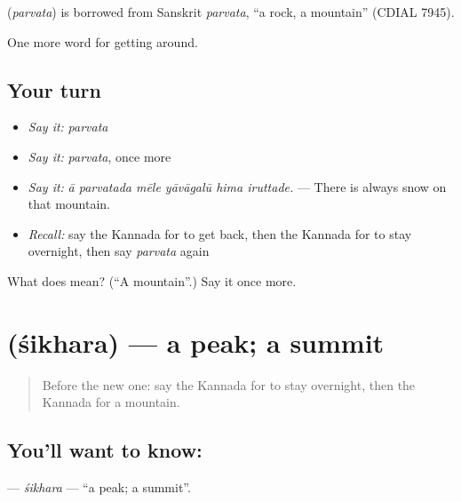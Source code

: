 \begin{cousinweb}
\textbf{} (\emph{parvata}) is borrowed from Sanskrit \emph{parvata}, \textquotedblleft{}a rock, a mountain\textquotedblright{} (CDIAL 7945).
\end{cousinweb}

\begin{grammarlens}[title={What you've built}]
One more word for getting around.
\end{grammarlens}

\subsection*{Your turn}
\begin{itemize}
\raggedright
  \item \emph{Say it:} \emph{parvata}
  \item \emph{Say it:} \emph{parvata}, once more
  \item \emph{Say it:} \emph{ā parvatada mēle yāvāgalū hima iruttade.} — There is always snow on that mountain.
  \item \emph{Recall:} say the Kannada for to get back, then the Kannada for to stay overnight, then say \emph{parvata} again
\end{itemize}

\begin{tcolorbox}[breakable,colback=teal!4,colframe=teal!35!black,title={Before you move on}]
What does  mean? (\textquotedblleft{}A mountain\textquotedblright{}.) Say it once more.
\end{tcolorbox}
\section[\texorpdfstring{\kn{ಶಿಖರ} (śikhara)}{ಶಿಖರ (śikhara)}]{ (śikhara) — a peak; a summit}

\label{lesson:KA-C459-sikhara}



\begin{quote}
Before the new one: say the Kannada for to stay overnight, then the Kannada for a mountain.
\end{quote}

\subsection*{You'll want to know: }
\textbf{} — \emph{śikhara} — \textquotedblleft{}a peak; a summit\textquotedblright{}.

